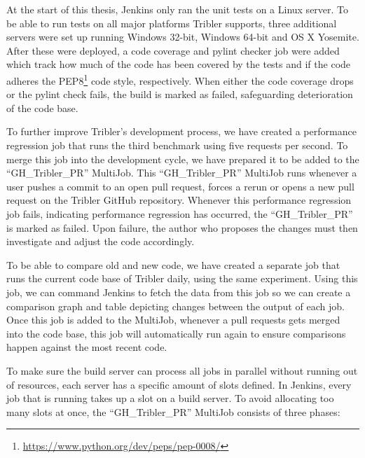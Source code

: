 At the start of this thesis, Jenkins only ran the unit tests on a Linux server.
To be able to run tests on all major platforms Tribler supports, three additional servers were set up running Windows 32-bit, Windows 64-bit and OS X Yosemite.
After these were deployed, a code coverage and pylint checker job were added which track how much of the code has been covered by the tests and if the code adheres the PEP8\footnote{\url{https://www.python.org/dev/peps/pep-0008/}} code style, respectively.
When either the code coverage drops or the pylint check fails, the build is marked as failed, safeguarding deterioration of the code base.

To further improve Tribler's development process, we have created a performance regression job that runs the third benchmark using five requests per second.
To merge this job into the development cycle, we have prepared it to be added to the \enquote{GH\_Tribler\_PR} MultiJob.
This \enquote{GH\_Tribler\_PR} MultiJob runs whenever a user pushes a commit to an open pull request, forces a rerun or opens a new pull request on the Tribler GitHub repository.
Whenever this performance regression job fails, indicating performance regression has occurred, the \enquote{GH\_Tribler\_PR} is marked as failed.
Upon failure, the author who proposes the changes must then investigate and adjust the code accordingly.

To be able to compare old and new code, we have created a separate job that runs the current code base of Tribler daily, using the same experiment.
Using this job, we can command Jenkins to fetch the data from this job so we can create a comparison graph and table depicting changes between the output of each job.
Once this job is added to the MultiJob, whenever a pull requests gets merged into the code base, this job will automatically run again to ensure comparisons happen against the most recent code.

To make sure the build server can process all jobs in parallel without running out of resources, each server has a specific amount of slots defined.
In Jenkins, every job that is running takes up a slot on a build server.
To avoid allocating too many slots at once, the \enquote{GH\_Tribler\_PR} MultiJob consists of three phases:

